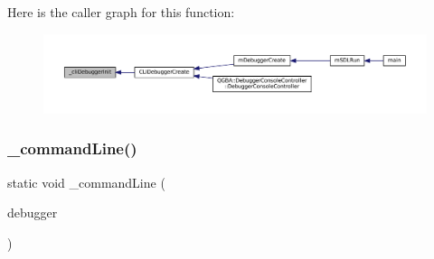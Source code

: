 Here is the caller graph for this function\+:
\nopagebreak
\begin{figure}[H]
\begin{center}
\leavevmode
\includegraphics[width=350pt]{debugger_2cli-debugger_8c_a8fc8c3e7e849f47910d638e282575262_icgraph}
\end{center}
\end{figure}
\mbox{\label{debugger_2cli-debugger_8c_ab978c53f9260e7091de8564374a914bb}} 
\subsubsection{\texorpdfstring{\+\_\+command\+Line()}{\_commandLine()}}
{\footnotesize\ttfamily static void \+\_\+command\+Line (\begin{DoxyParamCaption}\item[{struct m\+Debugger $\ast$}]{debugger }\end{DoxyParamCaption})\hspace{0.3cm}{\ttfamily [static]}}

